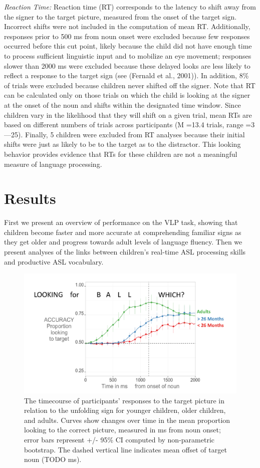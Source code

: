 \documentclass[12pt,]{article}
\begin{document}
\emph{Reaction Time:} Reaction time (RT) corresponds to the latency to
shift away from the signer to the target picture, measured from the
onset of the target sign. Incorrect shifts were not included in the
computation of mean RT. Additionally, responses prior to 500 ms from
noun onset were excluded because few responses occurred before this cut
point, likely because the child did not have enough time to process
sufficient linguistic input and to mobilize an eye movement; responses
slower than 2000 ms were excluded because these delayed looks are less
likely to reflect a response to the target sign (see (Fernald et al.,
2001)). In addition, 8\% of trials were excluded because children never
shifted off the signer. Note that RT can be calculated only on those
trials on which the child is looking at the signer at the onset of the
noun and shifts within the designated time window. Since children vary
in the likelihood that they will shift on a given trial, mean RTs are
based on different numbers of trials across participants (M =13.4
trials, range =3---25). Finally, 5 children were excluded from RT
analyses because their initial shifts were just as likely to be to the
target as to the distractor. This looking behavior provides evidence
that RTs for these children are not a meaningful measure of language
processing.

\section{Results}\label{results}

First we present an overview of performance on the VLP task, showing
that children become faster and more accurate at comprehending familiar
signs as they get older and progress towards adult levels of language
fluency. Then we present analyses of the links between children's
real-time ASL processing skills and productive ASL vocabulary.

\begin{figure}[htbp]
\centering
\includegraphics{Figs/profile plot png-1.pdf}
\caption{The timecourse of participants' responses to the target picture
in relation to the unfolding sign for younger children, older children,
and adults. Curves show changes over time in the mean proportion looking
to the correct picture, measured in ms from noun onset; error bars
represent +/- 95\% CI computed by non-parametric bootstrap. The dashed
vertical line indicates mean offset of target noun (TODO ms).}
\end{figure}
\end{document}
